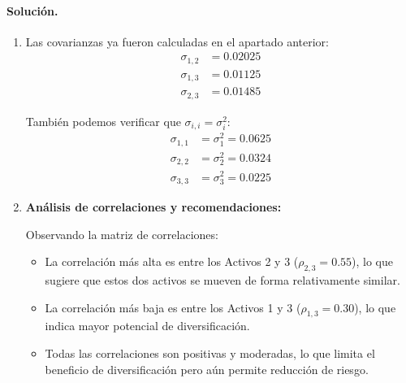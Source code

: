 \documentclass[12pt,a4paper]{article}
\newenvironment{solucion}{\paragraph{Solución.}}{}
\begin{document}
\begin{solucion}
\begin{enumerate}[label=\alph*)]
  Calculando cada término:
  \begin{align*}
  w_1^2 \sigma_1^2 &= 0.16 \times 0.0625 = 0.010000 \\
  w_2^2 \sigma_2^2 &= 0.1225 \times 0.0324 = 0.003969 \\
  w_3^2 \sigma_3^2 &= 0.0625 \times 0.0225 = 0.001406 \\
  2w_1 w_2 \sigma_{1,2} &= 2 \times 0.14 \times 0.02025 = 0.005670 \\
  2w_1 w_3 \sigma_{1,3} &= 2 \times 0.10 \times 0.01125 = 0.002250 \\
  2w_2 w_3 \sigma_{2,3} &= 2 \times 0.0875 \times 0.01485 = 0.002599
  \end{align*}

  Sumando todos los términos:
  \[
  \sigma_p^2 = 0.010000 + 0.003969 + 0.001406 + 0.005670 + 0.002250 + 0.002599 = 0.025894
  \]

  Desviación estándar:
  \[
  \sigma_p = \sqrt{0.025894} = 0.1609 = 16.09\%
  \]

  \item Las covarianzas ya fueron calculadas en el apartado anterior:
  \begin{align*}
  \sigma_{1,2} &= 0.02025 \\
  \sigma_{1,3} &= 0.01125 \\
  \sigma_{2,3} &= 0.01485
  \end{align*}

  También podemos verificar que $\sigma_{i,i} = \sigma_i^2$:
  \begin{align*}
  \sigma_{1,1} &= \sigma_1^2 = 0.0625 \\
  \sigma_{2,2} &= \sigma_2^2 = 0.0324 \\
  \sigma_{3,3} &= \sigma_3^2 = 0.0225
  \end{align*}

  \item \textbf{Análisis de correlaciones y recomendaciones:}
  
  Observando la matriz de correlaciones:
  \begin{itemize}
    \item La correlación más alta es entre los Activos 2 y 3 ($\rho_{2,3} = 0.55$), lo que sugiere que estos dos activos se mueven de forma relativamente similar.
    \item La correlación más baja es entre los Activos 1 y 3 ($\rho_{1,3} = 0.30$), lo que indica mayor potencial de diversificación.
    \item Todas las correlaciones son positivas y moderadas, lo que limita el beneficio de diversificación pero aún permite reducción de riesgo.
  \end{itemize}


\end{enumerate}
\end{solucion}
\end{document}
